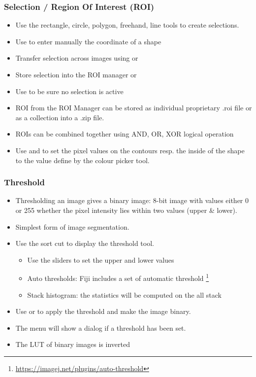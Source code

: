 \documentclass[ignorenonframetext,aspectratio=169,10pt,xcolor=table]{beamer}
\begin{document}
\begin{frame} \frametitle{Selection / Region Of Interest (ROI)}
  \begin{itemize}
  \item Use the rectangle, circle, polygon, freehand, line tools to
    create selections.
  \item Use  to enter manually the
    coordinate of a shape
  \item Transfer selection across images using
     or 
  \item Store selection into the ROI manager  or 
  \item Use   to
    be sure no selection is active
  \item ROI from the ROI Manager can be stored as individual
    proprietary .roi file or as a collection into a .zip file.
  \item ROIs can be combined together using AND, OR, XOR logical
    operation
  \item Use  and  to set the pixel
    values on the contours resp. the inside of the shape to the value
    define by the colour picker tool.
  \end{itemize}
\end{frame}

\begin{frame} \frametitle{Threshold}
  \begin{itemize}
  \item Thresholding an image gives a binary image: 8-bit image with
    values either 0 or 255 whether the pixel intensity lies within two
    values (upper \& lower).
  \item Simplest form of image segmentation.
  \item Use the sort cut  to display the threshold
    tool.
    \begin{itemize}
    \item Use the sliders to set the upper and lower values
    \item Auto thresholds: Fiji includes a set of automatic threshold
      \footnote{\url{https://imagej.net/plugins/auto-threshold}}
    \item Stack histogram: the statistics will be computed on the all
      stack
    \end{itemize}
  \item Use  or  to
    apply the threshold and make the image binary.
  \item The menu  will show a dialog
    if a threshold has been set.
  \item The LUT of binary images is inverted
  \end{itemize}
\end{frame}
\end{document}
